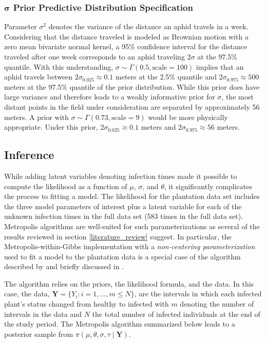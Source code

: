 \documentclass{uwstat572}
\begin{document}
\subsubsection{$\boldsymbol{\sigma}$ Prior Predictive Distribution Specification}
Parameter $\sigma^2$ denotes the variance of the distance an aphid travels in a week.
Considering that the distance traveled is modeled as Brownian motion with a zero mean bivariate normal kernel, a 95\% confidence interval for the distance traveled after one week corresponds to an aphid traveling $2\sigma$ at the 97.5\% quantile. 
With this understanding, $\sigma \sim \Gamma(0.5, \text{scale}=100)$ implies that an aphid travels between $2\sigma_{0.025} \approx 0.1$ meters at the 2.5\% quantile and $2\sigma_{0.975} \approx 500$ meters at the 97.5\% quantile of the prior distribution. 
While this prior does have large variance and therefore leads to a weakly informative prior for $\sigma$, the most distant points in the field under consideration are separated by approximately 56 meters. 
A prior with $\sigma \sim \Gamma(0.73, \text{scale}=9)$ would be more physically appropriate. 
Under this prior, $2\sigma_{0.025} \approx 0.1$ meters and $2\sigma_{0.975} \approx 56$ meters. 

\subsection{Inference}
\label{inference}
While adding latent variables denoting infection times made it possible to compute the likelihood as a function of $\mu$, $\sigma$, and $\theta$, it significantly complicates the process to fitting a model. 
The likelihood for the plantation data set includes the three model parameters of interest plus a latent variable for each of the unknown infection times in the full data set (583 times in the full data set). 
Metropolis algorithms are well-suited for such parameterizations as several of the results reviewed in section \ref{literature_review} suggest.  
In particular, the Metropolis-within-Gibbs implementation with a \textit{non-centering parameterization} used to fit a model to the plantation data is a special case of the algorithm described by \citet{Jewell} and briefly discussed in \citep{ONeill}.  

The algorithm relies on the priors, the likelihood formula, and the data. 
In this case, the data, $\textbf{Y} = \{Y_i:i=1,\dots, m \le N\}$, are the intervals in which each infected plant's status changed from healthy to infected with $m$ denoting the number of intervals in the data and $N$ the total number of infected individuals at the end of the study period. 
The Metropolis algorithm summarized below leads to a posterior sample from $\pi(\mu, \theta, \sigma, \tau \mid \textbf{Y})$. 
\end{document}

